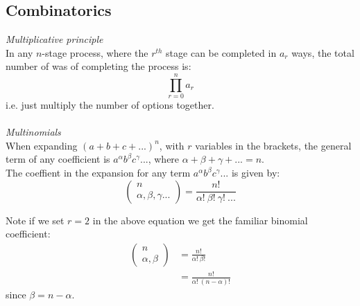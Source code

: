\documentclass{article}
\begin{document}
\subsection{Combinatorics}
\textit{Multiplicative principle}
\\
In any $ n $-stage process, where the $ r^{th} $ stage can be completed in $ a_{r} $ ways, the total number of was of completing the process is:
\begin{equation}
\prod_{r = 0}^{n} a_{r}
\end{equation}
i.e. just multiply the number of options together.
\\\\
\textit{Multinomials}
\\
When expanding $ (a + b + c + ...)^{n} $, with $ r $ variables in the brackets, the general term of any coefficient is $ a^{\alpha} b^{\beta} c^{\gamma}... $, where $ \alpha + \beta + \gamma + ... = n $.
\\
The coeffient in the expansion for any term $ a^{\alpha} b^{\beta} c^{\gamma}... $ is given by:
\begin{equation}
\begin{pmatrix}
n \\ \alpha,  \beta,  \gamma ...
\end{pmatrix}
=
\frac{n!}{\alpha! \ \beta! \ \gamma! \ ... }
\end{equation}
\begin{tcolorbox}
Note if we set $ r = 2 $ in the above equation we get the familiar binomial coefficient:
\begin{align}
\begin{pmatrix}
n \\ \alpha,  \beta
\end{pmatrix}
& =
\frac{n!}{\alpha! \ \beta!} \\
& = \frac{n!}{\alpha! \ (n - \alpha)!}
\end{align}
since $ \beta = n - \alpha $.
\end{tcolorbox}
\end{document}

